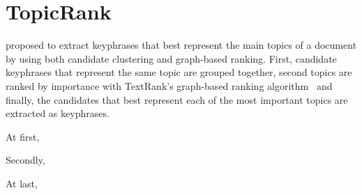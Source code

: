 \section{TopicRank}
\label{sec:topicrank}
   proposed to extract keyphrases that best
  represent the main topics of a document by using both candidate clustering and
  graph-based ranking. First, candidate keyphrases that represent the same topic
  are grouped together, second topics are ranked by importance with TextRank's
  graph-based ranking algorithm~\cite{mihalcea2004textrank} and finally, the
  candidates that best represent each of the most important topics are extracted
  as keyphrases.

  At first, 

  Secondly, 

  At last, 


